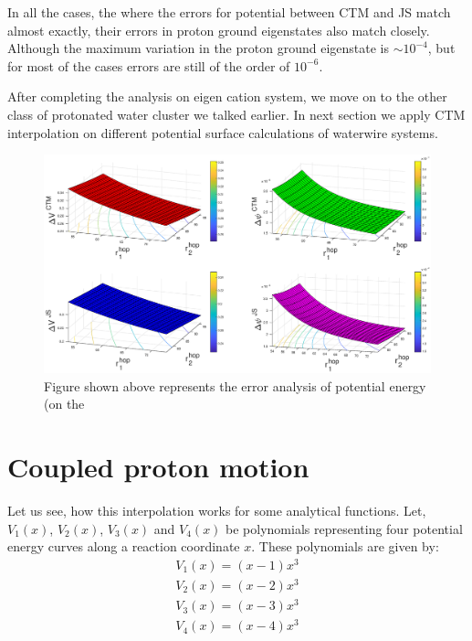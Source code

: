 In all the cases, the where the errors for potential between CTM and JS match almost exactly, their errors in
proton ground eigenstates also match closely. Although the maximum variation in the proton ground eigenstate is
$\sim 10^{-4}$, but for most of the cases errors are still of the order of $10^{-6}$.

After completing the analysis on eigen cation system, we move on to the other class of protonated water cluster
we talked earlier. In next section we apply CTM interpolation on different potential surface calculations of
waterwire systems.
 

\begin{figure}[htb!]
  \begin{center}
    \includegraphics[width=1\textwidth]{figures/autosubError.eps}
    \caption{\label{autosubScanEigen} Figure shown above represents the error analysis of potential energy (on the
    }
  \end{center}
\end{figure}





\section{Coupled proton motion}
{\label {analyticalPotentials}}
Let us see, how this interpolation works for some analytical functions. Let,
$V_{1}(x)$, $V_{2}(x)$, $V_{3}(x)$ and $V_{4}(x)$ be polynomials representing four potential energy
curves along a reaction coordinate $x$. These polynomials are given by:
\begin{eqnarray*}
V_{1}(x) = (x - 1)x^{3} \\
V_{2}(x) = (x - 2)x^{3} \\
V_{3}(x) = (x - 3)x^{3} \\
V_{4}(x) = (x - 4)x^{3}
\end{eqnarray*}

